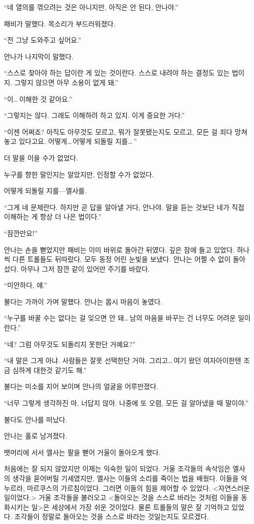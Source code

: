 ``네 열의를 꺾으려는 것은 아니지만, 아직은 안 된다, 안나야.''

패비가 말했다. 목소리가 부드러워졌다.

``전 그냥 도와주고 싶어요.''

안나가 나지막이 말했다.

``스스로 찾아야 하는 답이란 게 있는 것이란다. 스스로 내려야 하는 결정도 있는 법이지. 그렇지 않으면 아무 소용이 없게 돼.''

``이\ldots\,이해한 것 같아요.''

``그렇지는 않다. 그래도 이해하려 하고 있지. 이게 중요한 거다.''

``이젠 어쩌죠? 아직도 아무것도 모르고, 뭐가 잘못됐는지도 모르고, 모든 걸 죄다 망쳐놓고 있다고요. 어떻게\ldots\,어떻게 되돌릴 지를\ldots\,''

더 말을 이을 수가 없었다.

누구를 향한 말인지는 알았지만, 인정할 수가 없었다.

어떻게 되돌릴 지를—엘사를.

``그게 네 문제란다. 하지만 곧 답을 알아낼 거다, 안나야. 말을 듣는 것보단 네가 직접 이해하는 게 항상 더 나은 법이다.''

``잠깐만요!''

안나는 손을 뻗었지만 패비는 이미 바위로 돌아간 뒤였다. 깊은 잠에 들고 있었다. 하나씩 다른 트롤들도 뒤따랐다. 모두 동정 어린 눈빛을 보냈다. 안나는 어쩔 수 없이 돌아섰다. 아무나 그저 잠깐 같이 있어만 주기를 바랐다.

``미안하다, 얘.''

불다는 가까이 가며 말했다. 안나는 몹시 마음이 놓였다.

``누구를 바꿀 수는 없다는 걸 잊으면 안 돼\ldots\,남의 마음을 바꾸는 건 너무도 어려운 일이란다.''

``네? 그럼 아무것도 되돌리지 못한단 거예요?''

``내 말은 그게 아냐. 사람들은 잘못 선택한단 거야. 그리고\ldots\,여기 왔던 여자아이한텐 조금 심하게 대한것 같기도 해.''

불다는 미소를 지어 보이며 안나의 얼굴을 어루만졌다.

``너무 그렇게 생각하진 마, 너답지 않아. 나중에 또 오렴, 모든 걸 알아냈을 때 말이야.''

불다도 안나를 떠났다.

안나는 홀로 남겨졌다.

\textbreak

뱃머리에 서서 엘사는 팔을 뻗어 거울이 돌아오게 했다.

처음에는 잘 되지 않았지만 이제는 익숙한 일이 되었다. 거울 조각들의 속삭임은 엘사의 생각을 묻어버릴 기세였지만, 엘사는 이들의 소리를 죽이는 법을 배웠다. 이들을 억누르라, 마르쿠스의 가르침이었다. 그러면 이들의 힘을 제어할 수 있었다. <자연스러운 일이었다.> 거울 조각들을 불러오고 <돌아오는 것을 스스로 바라는 것처럼 이들을 동화시키는 일>은 세상에서 가장 쉬운 것이었다. 물론 트롤들의 말은 잘 기억하고 있었다. 조각들이 정말로 돌아오는 것을 스스로 바라는 것일는지도 모르겠다. %

